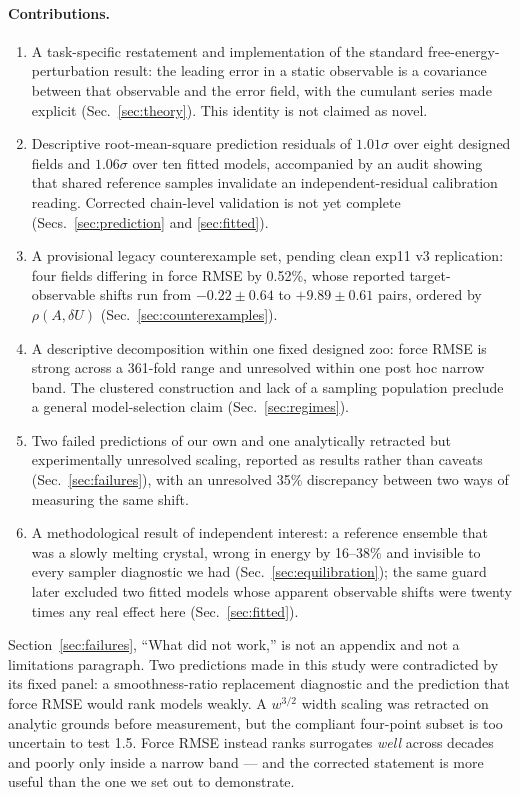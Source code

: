 \documentclass[aip,jcp,reprint,amsmath,amssymb,floatfix]{revtex4-2}
\newcommand{\dU}{\ensuremath{\delta U}}
\begin{document}
\paragraph*{Contributions.}
\begin{enumerate}
\item A task-specific restatement and implementation of the standard
free-energy-perturbation result: the leading error in a static observable is a
covariance between that observable and the error field, with the cumulant
series made explicit (Sec.~\ref{sec:theory}). This identity is not claimed as
novel.
\item Descriptive root-mean-square prediction residuals of $1.01\sigma$ over
eight designed fields and $1.06\sigma$ over ten fitted models, accompanied by an
audit showing that shared reference samples invalidate an independent-residual
calibration reading. Corrected chain-level validation is not yet complete
(Secs.~\ref{sec:prediction} and \ref{sec:fitted}).
\item A provisional legacy counterexample set, pending clean exp11 v3 replication:
four fields differing in force RMSE by 0.52\%, whose reported target-observable
shifts run from $-0.22 \pm 0.64$ to
$+9.89 \pm 0.61$ pairs, ordered by $\rho(A,\dU)$
(Sec.~\ref{sec:counterexamples}).
\item A descriptive decomposition within one fixed designed zoo: force RMSE is
strong across a 361-fold range and unresolved within one post hoc narrow band.
The clustered construction and lack of a sampling population preclude a general
model-selection claim (Sec.~\ref{sec:regimes}).
\item Two failed predictions of our own and one analytically retracted but
experimentally unresolved scaling, reported as results rather than caveats
(Sec.~\ref{sec:failures}), with an unresolved 35\% discrepancy
between two ways of measuring the same shift.
\item A methodological result of independent interest: a reference ensemble that
was a slowly melting crystal, wrong in energy by 16--38\% and invisible to
every sampler diagnostic we had (Sec.~\ref{sec:equilibration}); the same
guard later excluded two fitted models whose apparent observable
shifts were twenty times any real effect here (Sec.~\ref{sec:fitted}).
\end{enumerate}

Section~\ref{sec:failures}, ``What did not work,'' is not an appendix and not a
limitations paragraph. Two predictions made in this study were contradicted by
its fixed panel: a smoothness-ratio replacement diagnostic and the prediction
that force RMSE would rank models weakly. A $w^{3/2}$ width scaling was retracted
on analytic grounds before measurement, but the compliant four-point subset is
too uncertain to test 1.5. Force RMSE instead ranks
surrogates \emph{well} across decades and poorly only inside a narrow band ---
and the corrected statement is more useful than the one we set out to
demonstrate.
\end{document}
